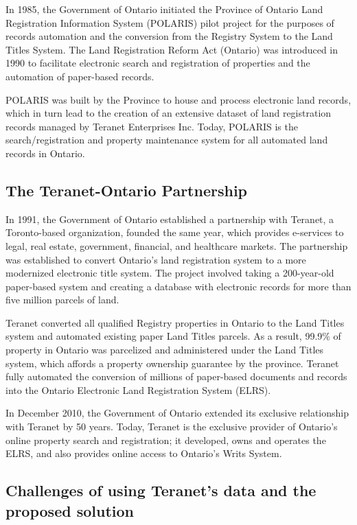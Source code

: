In 1985, the Government of Ontario initiated the Province of Ontario Land Registration Information System (POLARIS) pilot project for the purposes of records automation and the conversion from the Registry System to the Land Titles System.
The Land Registration Reform Act (Ontario)\cite{TheGovernmentofOntario1990} was introduced in 1990 to facilitate electronic search and registration of properties and the automation of paper-based records.

POLARIS was built by the Province to house and process electronic land records, which in turn lead to the creation of an extensive dataset of land registration records managed by Teranet Enterprises Inc.
Today, POLARIS is the search/registration and property maintenance system for all automated land records in Ontario.

\subsection{The Teranet-Ontario Partnership} \label{subsec:teranet_ontario}

In 1991, the Government of Ontario established a partnership with Teranet\cite{TeranetEnterprisesInc.2019}, a Toronto-based organization, founded the same year, which provides e-services to legal, real estate, government, financial, and healthcare markets.
The partnership was established to convert Ontario's land registration system to a more modernized electronic title system.
The project involved taking a 200-year-old paper-based system and creating a database with electronic records for more than five million parcels of land.

Teranet converted all qualified Registry properties in Ontario to the Land Titles system and automated existing paper Land Titles parcels.
As a result, 99.9\% of property in Ontario was parcelized and administered under the Land Titles system, which affords a property ownership guarantee by the province.
Teranet fully automated the conversion of millions of paper-based documents and records into the Ontario Electronic Land Registration System (ELRS).

In December 2010, the Government of Ontario extended its exclusive relationship with Teranet by 50 years.
Today, Teranet is the exclusive provider of Ontario's online property search and registration;
it developed, owns and operates the ELRS, and also provides online access to Ontario's Writs System.

\subsection{Challenges of using Teranet's data and the proposed solution} \label{subsec:challenges}


